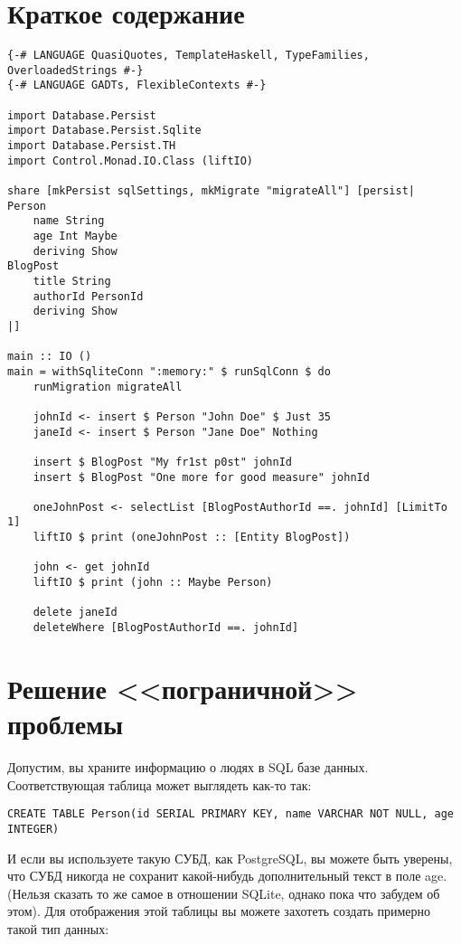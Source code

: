 \section{Краткое содержание} %

\begin{lstlisting}
{-# LANGUAGE QuasiQuotes, TemplateHaskell, TypeFamilies, OverloadedStrings #-}
{-# LANGUAGE GADTs, FlexibleContexts #-}

import Database.Persist
import Database.Persist.Sqlite
import Database.Persist.TH
import Control.Monad.IO.Class (liftIO)

share [mkPersist sqlSettings, mkMigrate "migrateAll"] [persist|
Person
    name String
    age Int Maybe
    deriving Show
BlogPost
    title String
    authorId PersonId
    deriving Show
|]

main :: IO ()
main = withSqliteConn ":memory:" $ runSqlConn $ do
    runMigration migrateAll

    johnId <- insert $ Person "John Doe" $ Just 35
    janeId <- insert $ Person "Jane Doe" Nothing

    insert $ BlogPost "My fr1st p0st" johnId
    insert $ BlogPost "One more for good measure" johnId

    oneJohnPost <- selectList [BlogPostAuthorId ==. johnId] [LimitTo 1]
    liftIO $ print (oneJohnPost :: [Entity BlogPost])

    john <- get johnId
    liftIO $ print (john :: Maybe Person)

    delete janeId
    deleteWhere [BlogPostAuthorId ==. johnId]
\end{lstlisting}%

\section{Решение <<пограничной>> проблемы} %

Допустим, вы храните информацию о людях в SQL базе данных. Соответствующая таблица может выглядеть как-то так:

\begin{lstlisting}
CREATE TABLE Person(id SERIAL PRIMARY KEY, name VARCHAR NOT NULL, age INTEGER)
\end{lstlisting}

И если вы используете такую СУБД, как PostgreSQL, вы можете быть уверены, что СУБД никогда не сохранит какой-нибудь дополнительный текст в поле age. (Нельзя сказать то же самое в отношении SQLite, однако пока что забудем об этом). Для отображения этой таблицы вы можете захотеть создать примерно такой тип данных:

